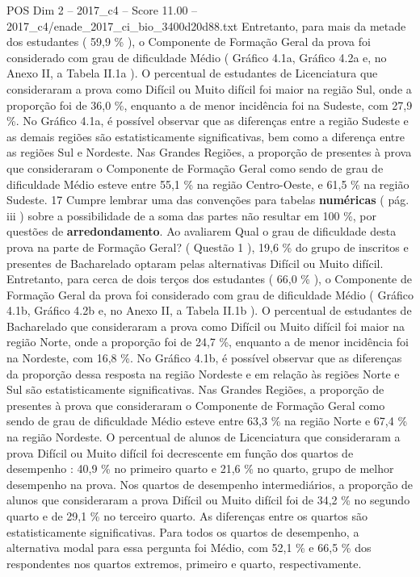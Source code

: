 \begin{textsample}{POS Dim 2 – 2017\_c4 – Score 11.00 – 2017\_c4/enade\_2017\_ci\_bio\_3400d20d88.txt}
Entretanto, para mais da metade dos estudantes ( 59,9 \% ), o Componente de Formação Geral da prova foi considerado com grau de dificuldade Médio ( Gráfico 4.1a, Gráfico 4.2a e, no Anexo II, a Tabela II.1a ).
O percentual de estudantes de Licenciatura que consideraram a prova como Difícil ou Muito difícil foi maior na região Sul, onde a proporção foi de 36,0 \%, enquanto a de menor incidência foi na Sudeste, com 27,9 \%.
No Gráfico 4.1a, é possível observar que as diferenças entre a região Sudeste e as demais regiões são estatisticamente significativas, bem como a diferença entre as regiões Sul e Nordeste.
Nas Grandes Regiões, a proporção de presentes à prova que consideraram o Componente de Formação Geral como sendo de grau de dificuldade Médio esteve entre 55,1 \% na região Centro-Oeste, e 61,5 \% na região Sudeste. 17 Cumpre lembrar uma das convenções para tabelas \textbf{numéricas} ( pág. iii ) sobre a possibilidade de a soma das partes não resultar em 100 \%, por questões de \textbf{arredondamento}.
Ao avaliarem Qual o grau de dificuldade desta prova na parte de Formação Geral? ( Questão 1 ), 19,6 \% do grupo de inscritos e presentes de Bacharelado optaram pelas alternativas Difícil ou Muito difícil.
Entretanto, para cerca de dois terços dos estudantes ( 66,0 \% ), o Componente de Formação Geral da prova foi considerado com grau de dificuldade Médio ( Gráfico 4.1b, Gráfico 4.2b e, no Anexo II, a Tabela II.1b ).
O percentual de estudantes de Bacharelado que consideraram a prova como Difícil ou Muito difícil foi maior na região Norte, onde a proporção foi de 24,7 \%, enquanto a de menor incidência foi na Nordeste, com 16,8 \%.
No Gráfico 4.1b, é possível observar que as diferenças da proporção dessa resposta na região Nordeste e em relação às regiões Norte e Sul são estatisticamente significativas.
Nas Grandes Regiões, a proporção de presentes à prova que consideraram o Componente de Formação Geral como sendo de grau de dificuldade Médio esteve entre 63,3 \% na região Norte e 67,4 \% na região Nordeste.
O percentual de alunos de Licenciatura que consideraram a prova Difícil ou Muito difícil foi decrescente em função dos quartos de desempenho : 40,9 \% no primeiro quarto e 21,6 \% no quarto, grupo de melhor desempenho na prova.
Nos quartos de desempenho intermediários, a proporção de alunos que consideraram a prova Difícil ou Muito difícil foi de 34,2 \% no segundo quarto e de 29,1 \% no terceiro quarto.
As diferenças entre os quartos são estatisticamente significativas.
Para todos os quartos de desempenho, a alternativa modal para essa pergunta foi Médio, com 52,1 \% e 66,5 \% dos respondentes nos quartos extremos, primeiro e quarto, respectivamente.

\end{textsample}
